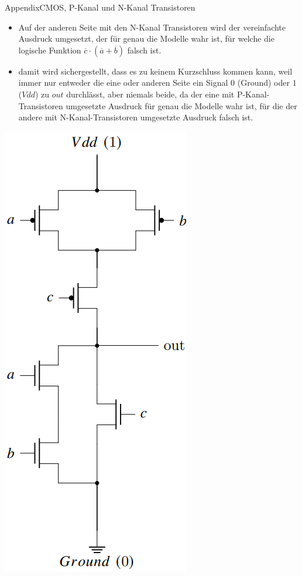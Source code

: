 \begin{frame}[allowframebreaks]{Appendix}{CMOS, P-Kanal und N-Kanal Transistoren}
\begin{solutionnoinc}
\begin{itemize}
        \item Auf der anderen Seite mit den N-Kanal Transistoren wird der vereinfachte Ausdruck umgesetzt, der für genau die Modelle wahr ist, für welche die logische Funktion $\overline{c}\cdot(\overline{a}+\overline{b})$ \alert{falsch} ist.
        \item damit wird sichergestellt, dass es zu keinem \alert{Kurzschluss} kommen kann, weil immer nur entweder die eine oder anderen Seite ein Signal $0$ (Ground) oder $1$ ($Vdd$) zu $out$ durchlässt, aber niemals beide, da der eine mit P-Kanal-Transistoren umgesetzte Ausdruck für genau die Modelle wahr ist, für die der andere mit N-Kanal-Transistoren umgesetzte Ausdruck falsch ist.
    \end{itemize}
\end{solutionnoinc}
\begin{solutionnoinc}
    \includegraphics[height=0.6\textheight, center]{./figures/3.png}
\end{solutionnoinc}
\end{frame}


